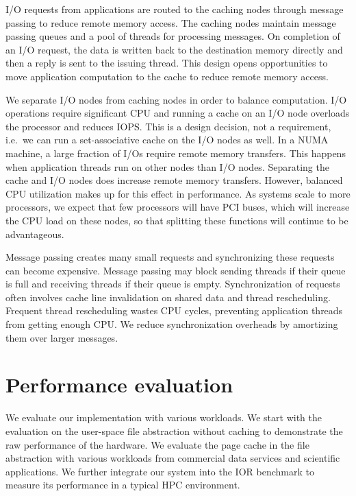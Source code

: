 I/O requests from applications are routed to the caching nodes through
message passing to reduce remote memory access. The caching nodes maintain
message passing queues and
a pool of threads for processing messages.
On completion of an I/O request, the data is written back to
the destination memory directly and then a reply is sent to the issuing thread.
This design opens opportunities to move application computation to the cache
to reduce remote memory access.

We separate I/O nodes from caching nodes in order to balance computation.
I/O operations require significant CPU and running a cache on an I/O node
overloads the processor and reduces IOPS.  This is a design decision, not a
requirement, i.e.~we can run a set-associative cache on the I/O nodes as well.
In a NUMA machine, a large fraction of I/Os require remote memory transfers.  
This happens when application threads run on other nodes than I/O nodes.
Separating the cache and I/O nodes does increase remote memory transfers.
However, balanced CPU utilization makes up for this effect in performance.
As systems scale to more processors, we expect that
few processors will have PCI buses, which will increase the CPU load on these nodes,
so that splitting these functions will continue to be advantageous.

Message passing creates many small requests and synchronizing these requests
can become expensive.
Message passing may block sending
threads if their queue is full and receiving threads if their queue is empty.
Synchronization of requests often involves 
cache line invalidation on shared data and thread rescheduling. 
Frequent thread rescheduling wastes CPU cycles, preventing application threads 
from getting enough CPU.  
We reduce synchronization overheads by amortizing them over larger messages.

\section{Performance evaluation}
We evaluate our implementation with various workloads. We start with the
evaluation on the user-space file abstraction without caching to demonstrate
the raw performance of the hardware. We evaluate the page cache in the file
abstraction with various workloads from commercial data services and scientific
applications. We further integrate our system into the IOR benchmark \cite{IOR}
to measure its performance in a typical HPC environment.

